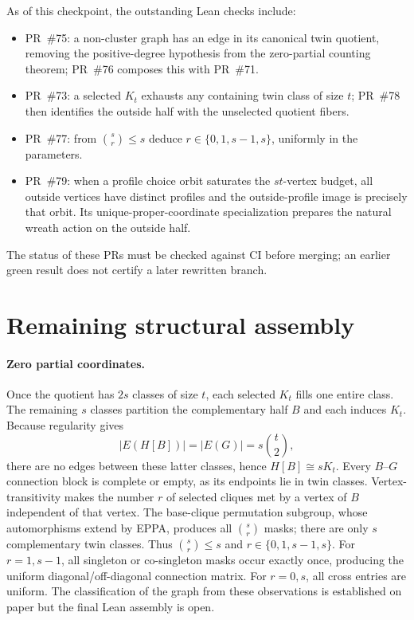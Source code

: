 \documentclass[11pt,a4paper]{article}
\begin{document}
As of this checkpoint, the outstanding Lean checks include:
\begin{itemize}
\item PR~\#75: a non-cluster graph has an edge in its canonical
  twin quotient, removing the positive-degree hypothesis
  from the zero-partial counting theorem;
  PR~\#76 composes this with PR~\#71.
\item PR~\#73: a selected \(K_t\) exhausts any containing
  twin class of size \(t\); PR~\#78 then identifies
  the outside half with the unselected quotient fibers.
\item PR~\#77: from \(\binom sr\le s\) deduce
  \(r\in\{0,1,s-1,s\}\), uniformly in the parameters.
\item PR~\#79: when a profile choice orbit saturates the
  \(st\)-vertex budget, all outside vertices have distinct
  profiles and the outside-profile image is precisely
  that orbit. Its unique-proper-coordinate specialization
  prepares the natural wreath action on the outside half.
\end{itemize}
The status of these PRs must be checked against CI before merging;
an earlier green result does not certify a later rewritten branch.

\section*{Remaining structural assembly}

\paragraph{Zero partial coordinates.}
Once the quotient has \(2s\) classes of size \(t\),
each selected \(K_t\) fills one entire class.
The remaining \(s\) classes partition the complementary half \(B\)
and each induces \(K_t\). Because regularity gives
\[
    |E(H[B])|=|E(G)|=s\binom t2 ,
\]
there are no edges between these latter classes, hence
\(H[B]\cong sK_t\).
Every \(B\)--\(G\) connection block is complete or empty,
as its endpoints lie in twin classes.
Vertex-transitivity makes the number \(r\) of selected
cliques met by a vertex of \(B\) independent of that vertex.
The base-clique permutation subgroup, whose automorphisms
extend by EPPA, produces all
\(\binom sr\) masks; there are only \(s\) complementary
twin classes. Thus \(\binom sr\le s\) and
\(r\in\{0,1,s-1,s\}\).
For \(r=1,s-1\), all singleton or co-singleton masks
occur exactly once, producing the uniform diagonal/off-diagonal
connection matrix. For \(r=0,s\), all cross entries are uniform.
The classification of the graph from these observations
is established on paper but the final Lean assembly is open.
\end{document}
